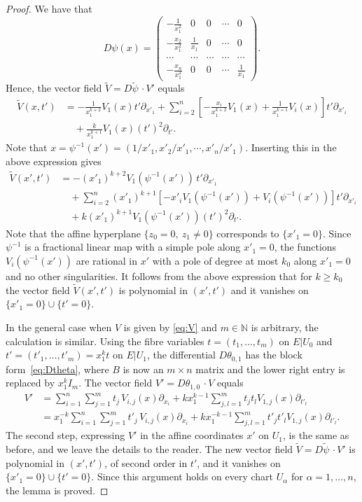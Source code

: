 \documentclass[12pt]{amsart}
\theoremstyle{definition}
\numberwithin{equation}{section}
\numberwithin{figure}{section}
\newcommand\N{\mathbb{N}}
\newcommand\wt{\widetilde}
\newcommand\di{\partial}
\numberwithin{equation}{section}
\begin{document}
\begin{proof}
We have that 
\[
	D\psi(x)=
	\begin{pmatrix}
	-\frac{1}{x_1^2} & 0 & 0 & \cdots & 0 \\
	-\frac{x_2}{x_1^2} & \frac{1}{x_1} & 0 & \cdots & 0 \\
	\cdots & \cdots & \cdots & \cdots & \cdots  \\
	-\frac{x_n}{x_1^2} & 0 & 0 & \cdots & \frac{1}{x_1}
	\end{pmatrix}.
\]
Hence, the vector field $\wt V=D\tilde\psi\,\cdotp V'$ equals
\begin{align*}
	\wt V(x,t') &= -\frac{1}{x_1^{k+2}} V_1(x) t' \di_{x'_1} 
 	+\sum_{i=2}^n \left[ - \frac{x_i}{x_1^{k+2}} V_1(x) 
	+ \frac{1}{x_1^{k+1}} V_i(x)\right] t' \di_{x'_i} \\
	&\quad + \frac{k}{x_1^{k+1}} V_1(x) (t')^2 \di_{t'}. 
\end{align*}	
Note that $x=\psi^{-1}(x')=(1/x'_1,x'_2/x'_1,\cdots,x'_n/x'_1)$.
Inserting this in the above expression gives  
\begin{align*}\label{eq:Vtilde}
	\wt V(x',t') &= -(x'_1)^{k+2} V_1(\psi^{-1}(x')) \, t' \di_{x'_1} \\ 
	&\quad	+\sum_{i=2}^n (x'_1)^{k+1}  \left[ - x'_i V_1(\psi^{-1}(x')) 
		+ V_i(\psi^{-1}(x')) \right]  t' \di_{x'_i} 	\\
	&\quad + k (x'_1)^{k+1} V_1(\psi^{-1}(x')) (t')^2 \di_{t'}.
\end{align*}
Note that the affine hyperplane $\{z_0=0,\ z_1\ne 0\}$ 
corresponds to $\{x'_1=0\}$. 
Since $\psi^{-1}$ is a fractional linear map with a simple
pole along $x'_1=0$, the functions $V_i(\psi^{-1}(x'))$ are rational
in $x'$ with a pole of degree at most $k_0$ along $x'_1=0$ 
and no other singularities. It follows from the above expression 
that for $k\ge k_0$ the vector field $\wt V(x',t')$ is polynomial in $(x',t')$
and it vanishes on $\{x'_1=0\}\cup\{t'=0\}$.

In the general case when $V$ is given by \eqref{eq:V} and $m\in\N$
is arbitrary, the calculation is similar. Using the fibre
variables $t=(t_1,\ldots,t_m)$ on $E|U_0$ and
$t'=(t'_1,\ldots,t'_m)=x_1^k t$ on $E|U_1$, 
the differential $D\theta_{0,1}$ has the block form~\eqref{eq:Dtheta},
where $B$ is now an $m\times n$ matrix and the lower right 
entry is replaced by $x_1^{k}I_m$. The vector field 
$V'=D\theta_{1,0} \, \cdotp V$ equals
\begin{align*}%
	V' &= \sum_{i=1}^n \sum_{j=1}^m t_j\, V_{i,j}(x) \di_{x_i} 
	  	 + k x_1^{k-1} \sum_{j,l=1}^m t_jt_l V_{1,j}(x) \di_{t'_l} \\
	   &= x_1^{-k} \sum_{i=1}^n \sum_{j=1}^m t'_j\, V_{i,j}(x) \di_{x_i} 
	   	 + k x_1^{-k-1} \sum_{j,l=1}^m t'_j t'_l V_{1,j}(x) \di_{t'_l}.
\end{align*}
The second step, expressing $V'$ in the affine coordinates $x'$
on $U_1$, is the same as before, and we leave 
the details to the reader. The new vector field 
$\wt V=D\tilde\psi\,\cdotp V'$ 
is polynomial in $(x',t')$, of second order in $t'$, and   
it vanishes on $\{x'_1=0\}\cup\{t'=0\}$.
Since this argument holds on every chart $U_\alpha$ for 
$\alpha=1,\ldots,n$, the lemma is proved.
\end{proof}
\end{document}
